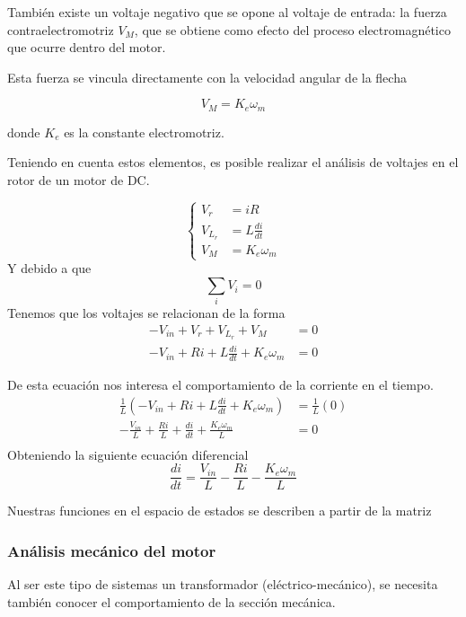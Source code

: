 También existe un voltaje negativo que se opone al voltaje de entrada:
la fuerza contraelectromotriz $V_M$, que se obtiene como efecto del proceso
electromagnético que ocurre dentro del motor.

Esta fuerza se vincula directamente con la velocidad angular de la flecha

$$V_{M} = K_e \omega_m$$

donde $K_e$ es la constante electromotriz.

Teniendo en cuenta estos elementos, es posible realizar el análisis de voltajes
en el rotor de un motor de DC.

\begin{equation*}
  \begin{cases}
    V_r    &= iR  \\
    V_{L_r}&=L \frac{di}{dt} \\
    V_{M}  &= K_e \omega_m
  \end{cases}
\end{equation*}
Y debido a que
$$
\sum_i V_i = 0
$$
Tenemos que los voltajes se relacionan de la forma
\begin{equation}
  \begin{aligned}
    -V_{in} + V_r + V_{L_r}       + V_{M} &= 0\\
    -V_{in} + Ri  + L\frac{di}{dt} + K_e\omega_m &= 0
  \end{aligned}
\end{equation}

De esta ecuación nos interesa el comportamiento de la corriente en el tiempo.
\begin{equation*}
  \begin{aligned}
    \frac1L \left(
      -V_{in} + Ri  + L\frac{di}{dt} + K_e\omega_m
    \right) &=\frac1L  (0) \\
      -\frac{V_{in}}L + \frac{Ri}L  + \frac{di}{dt} + \frac{K_e\omega_m}{L}
     &=  0 \\
  \end{aligned}
\end{equation*}
Obteniendo la siguiente ecuación diferencial
\begin{equation}
      \frac{di}{dt} = \frac{V_{in}}L - \frac{Ri}L  - \frac{K_e\omega_m}{L}
      \label{eq:DiferencialCorriente}
\end{equation}

Nuestras funciones en el espacio de estados se describen a partir de la
matriz

\subsubsection{Análisis mecánico del motor}
Al ser este tipo de sistemas un transformador (eléctrico-mecánico), se
necesita también conocer el comportamiento de la sección mecánica.


